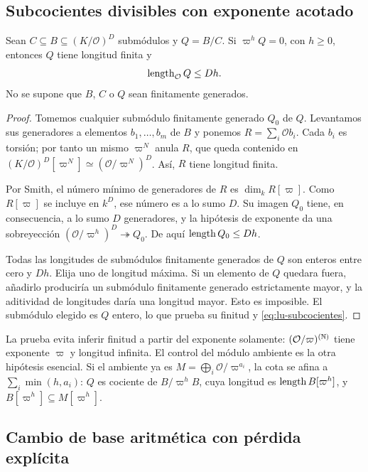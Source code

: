 \subsection{Subcocientes divisibles con exponente acotado}
\label{subsec:lu-subcocientes}

\begin{lema}
\label{lem:lu-subcocientes}
Sean $C\subseteq B\subseteq(K/\mathcal O)^D$ submódulos y
$Q=B/C$. Si $\varpi^hQ=0$, con $h\ge0$, entonces $Q$ tiene
longitud finita y
\begin{equation}
 \operatorname{length}_{\mathcal O}Q\le Dh.
 \label{eq:lu-subcocientes}
\end{equation}
No se supone que $B$, $C$ o $Q$ sean finitamente generados.
\end{lema}
\begin{proof}
Tomemos cualquier submódulo finitamente generado $Q_0$ de $Q$.
Levantamos sus generadores a elementos $b_1,\ldots,b_m$ de $B$
y ponemos $R=\sum_i\mathcal O b_i$. Cada $b_i$ es torsión;
por tanto un mismo $\varpi^N$ anula $R$, que queda contenido en
$(K/\mathcal O)^D[\varpi^N]\simeq(\mathcal O/\varpi^N)^D$.
Así, $R$ tiene longitud finita.

Por Smith, el número mínimo de generadores de $R$ es
$\dim_k R[\varpi]$. Como $R[\varpi]$ se incluye en $k^D$, ese
número es a lo sumo $D$. Su imagen $Q_0$ tiene, en consecuencia,
a lo sumo $D$ generadores, y la hipótesis de exponente da una
sobreyección $(\mathcal O/\varpi^h)^D\twoheadrightarrow Q_0$.
De aquí $\operatorname{length} Q_0\le Dh$.

Todas las longitudes de submódulos finitamente generados de $Q$
son enteros entre cero y $Dh$. Elija uno de longitud máxima.
Si un elemento de $Q$ quedara fuera, añadirlo produciría un
submódulo finitamente generado estrictamente mayor, y la
aditividad de longitudes daría una longitud mayor. Esto es
imposible. El submódulo elegido es $Q$ entero, lo que prueba
su finitud y \eqref{eq:lu-subcocientes}.
\end{proof}

La prueba evita inferir finitud a partir del exponente solamente:
$(\mathcal O/\varpi)^{(\mathbb{N})}$ tiene exponente $\varpi$ y longitud
infinita. El control del módulo ambiente es la otra hipótesis
esencial. Si el ambiente ya es
$M=\bigoplus_i\mathcal O/\varpi^{a_i}$, la cota se afina a
$\sum_i\min(h,a_i)$: $Q$ es cociente de $B/\varpi^hB$,
cuya longitud es $\operatorname{length} B[\varpi^h]$, y
$B[\varpi^h]\subseteq M[\varpi^h]$.

\subsection{Cambio de base aritmética con pérdida explícita}
\label{subsec:lu-restriccion}

